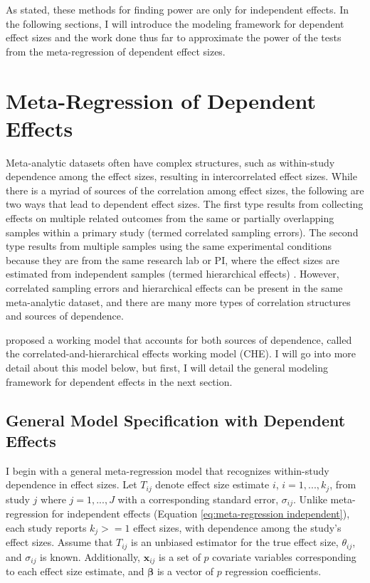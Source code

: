 As stated, these methods for finding power are only for independent effects. In the following sections, I will introduce the modeling framework for dependent effect sizes and the work done thus far to approximate the power of the tests from the meta-regression of dependent effect sizes. 

\section{Meta-Regression of Dependent Effects}

Meta-analytic datasets often have complex structures, such as within-study dependence among the effect sizes, resulting in intercorrelated effect sizes. While there is a myriad of sources of the correlation among effect sizes, the following are two ways that lead to dependent effect sizes. The first type results from collecting effects on multiple related outcomes from the same or partially overlapping samples within a primary study (termed correlated sampling errors). The second type results from multiple samples using the same experimental conditions because they are from the same research lab or PI, where the effect sizes are estimated from independent samples (termed hierarchical effects) \autocite{hedges2010}. However, correlated sampling errors and hierarchical effects can be present in the same meta-analytic dataset, and there are many more types of correlation structures and sources of dependence.  

\textcite{pustejovsky2022} proposed a working model that accounts for both sources of dependence, called the correlated-and-hierarchical effects working model (CHE). I will go into more detail about this model below, but first, I will detail the general modeling framework for dependent effects in the next section. 

\subsection{General Model Specification with Dependent Effects}

I begin with a general meta-regression model that recognizes within-study dependence in effect sizes. Let $T_{ij}$ denote effect size estimate $i$, $i = 1, ..., k_j$, from study $j$ where $j=1,..., J$ with a corresponding standard error, $\sigma_{ij}$. Unlike meta-regression for independent effects (Equation \ref{eq:meta-regression independent}), each study reports $k_j >= 1$ effect sizes, with dependence among the study's effect sizes. Assume that $T_{ij}$ is an unbiased estimator for the true effect size, $\theta_{ij}$, and $\sigma_{ij}$ is known. Additionally, $\mathbf{x}_{ij}$ is a set of $p$ covariate variables corresponding to each effect size estimate, and $\boldsymbol{\beta}$ is a vector of $p$ regression coefficients. 

